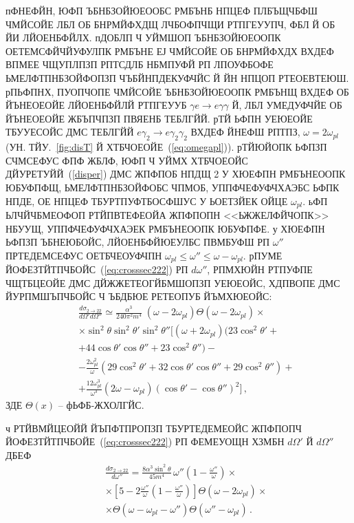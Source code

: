 \documentclass[koi8-r]{pazh2col}
\begin{document}
пФНЕФЙН, ЮФП ЪБНБЗОЙЮЕООБС РМБЪНБ НПЦЕФ ПЛБЪЩЧБФШ ЧМЙСОЙЕ ЛБЛ ОБ БНРМЙФХДЩ ЛЧБОФПЧЩИ 
РТПГЕУУПЧ, ФБЛ Й ОБ ЙИ ЛЙОЕНБФЙЛХ. пДОБЛП Ч УЙМШОП ЪБНБЗОЙЮЕООПК ОЕТЕМСФЙЧЙУФУЛПК РМБЪНЕ ЕЈ 
ЧМЙСОЙЕ ОБ БНРМЙФХДХ ВХДЕФ ВПМЕЕ 
ЧЩУПЛПЗП РПТСДЛБ НБМПУФЙ РП ЛПОУФБОФЕ ЬМЕЛФТПНБЗОЙФОПЗП ЧЪБЙНПДЕКУФЧЙС Й ЙН НПЦОП РТЕОЕВТЕЮШ. рПЬФПНХ, 
ПУОПЧОПЕ ЧМЙСОЙЕ ЪБНБЗОЙЮЕООПК РМБЪНЩ  ВХДЕФ ОБ ЙЪНЕОЕОЙЕ ЛЙОЕНБФЙЛЙ РТПГЕУУБ $\gamma e \to e \gamma \gamma$ Й, 
ЛБЛ УМЕДУФЧЙЕ ОБ ЙЪНЕОЕОЙЕ ЖБЪПЧПЗП ПВЯЕНБ ТЕБЛГЙЙ.
 рТЙ ЬФПН УЕЮЕОЙЕ ТБУУЕСОЙС ДМС ТЕБЛГЙЙ 
$e \gamma_2 \to e \gamma_2 \gamma_2$ ВХДЕФ ЙНЕФШ РПТПЗ, $\omega = 2 \omega_{pl}$ (УН. ТЙУ.~\ref{fig:disT} 
Й ХТБЧОЕОЙЕ~(\ref{eq:omegapl})). рТЙЮЙОПК ЬФПЗП СЧМСЕФУС ФПФ ЖБЛФ, ЮФП Ч 
УЙМХ  ХТБЧОЕОЙС ДЙУРЕТУЙЙ~(\ref{disper}) ДМС ЖПФПОБ НПДЩ 2 У ХЮЕФПН РМБЪНЕООПК ЮБУФПФЩ, ЬМЕЛФТПНБЗОЙФОБС ЧПМОБ, 
УППФЧЕФУФЧХАЭБС ЬФПК НПДЕ, ОЕ НПЦЕФ ТБУРТПУФТБОСФШУС У ЬОЕТЗЙЕК ОЙЦЕ  $\omega_{pl}$. ьФП ЬЛЧЙЧБМЕОФОП 
РТЙПВТЕФЕОЙА ЖПФПОПН <<ЬЖЖЕЛФЙЧОПК>> НБУУЩ, УППФЧЕФУФЧХАЭЕК РМБЪНЕООПК ЮБУФПФЕ.
 у ХЮЕФПН ЬФПЗП ЪБНЕЮБОЙС, ЛЙОЕНБФЙЮЕУЛБС ПВМБУФШ РП $\omega''$  ПРТЕДЕМСЕФУС ОЕТБЧЕОУФЧПН 
$\omega_{pl} \leq \omega'' \leq \omega-\omega_{pl}$.
 рПУМЕ ЙОФЕЗТЙТПЧБОЙС~(\ref{eq:crosssec222}) РП $d \omega''$, 
РПМХЮЙН РТПУФПЕ ЧЩТБЦЕОЙЕ ДМС ДЙЖЖЕТЕОГЙБМШОПЗП УЕЮЕОЙС, ХДПВОПЕ 
ДМС ЙУРПМШЪПЧБОЙС Ч ЪБДБЮЕ РЕТЕОПУБ ЙЪМХЮЕОЙС:
%
\begin{eqnarray}
\nonumber
&&\frac{d \sigma_{2 \to 22}}{d\Omega' d\Omega''} \simeq \frac{\alpha^3 }{240 \pi^2 m^4} \; 
(\omega-2\omega_{pl}) \Theta (\omega-2\omega_{pl}) \times
\\
\nonumber
&& \times \sin^2{\theta} \sin^2{\theta'} \sin^2{\theta''} \Big [(\omega +2 \omega_{pl})(23 \cos^2{\theta'} +
\\
\nonumber
&&+ 44 \cos{\theta'} \cos{\theta''}  
+23 \cos^2{\theta''}) -
\\
\nonumber
&& -
\frac{2 \omega_{pl}^2}{\omega} 
(29 \cos^2{\theta'} + 
32 \cos{\theta'} \cos{\theta''} + 29 \cos^2{\theta''}) + 
\\
\label{eq:difcross222}
&&
+\frac{12 \omega_{pl}^3}{\omega^3} (2 \omega - \omega_{pl}) (\cos{\theta'} -\cos{\theta''})^2 \Big] \, , 
\end{eqnarray}
\noindent ЗДЕ $\Theta (x)$ -- фЬФБ-ЖХОЛГЙС. 

ч РТЙВМЙЦЕОЙЙ  ЙЪПФТПРОПЗП ТБУРТЕДЕМЕОЙС ЖПФПОПЧ ЙОФЕЗТЙТПЧБОЙЕ~(\ref{eq:crosssec222}) РП ФЕМЕУОЩН 
ХЗМБН  $d \Omega'$  Й  $d \Omega''$  ДБЕФ
%
\begin{eqnarray}
\label{eq:difcromega}
&&\frac{d \sigma_{2 \to 22}}{d\omega''} = \frac{8 \alpha^3 \sin^2{\theta}}{45  m^4} \, \omega'' 
\left(1-\frac{\omega''}{\omega} \right) \times 
\\
\nonumber
&& \times
\left [5 - 2 \frac{\omega''}{\omega} \left(1-\frac{\omega''}{\omega} \right) \right] 
\Theta (\omega-2\omega_{pl}) \times
\\
\nonumber
&&\times
\Theta (\omega - \omega_{pl} -\omega'') \Theta (\omega''-\omega_{pl})\, .
\end{eqnarray}
\end{document}
